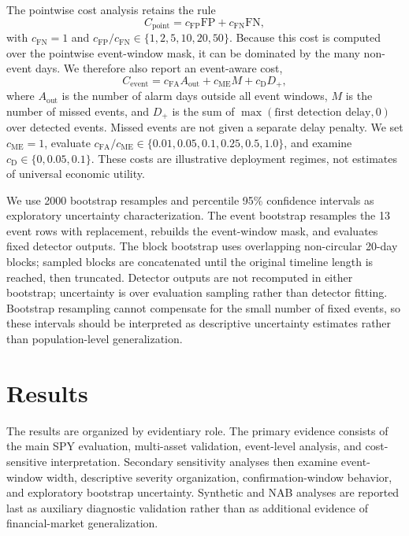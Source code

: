 \documentclass[pdflatex,sn-mathphys-num]{sn-jnl}
\begin{document}
The pointwise cost analysis retains the rule
\begin{equation}
C_{\mathrm{point}}=c_{\mathrm{FP}}\mathrm{FP}+c_{\mathrm{FN}}\mathrm{FN},
\end{equation}
with $c_{\mathrm{FN}}=1$ and $c_{\mathrm{FP}}/c_{\mathrm{FN}}\in\{1,2,5,10,20,50\}$. Because this cost is computed over the pointwise event-window mask, it can be dominated by the many non-event days. We therefore also report an event-aware cost,
\begin{equation}
C_{\mathrm{event}}=c_{\mathrm{FA}}A_{\mathrm{out}}+c_{\mathrm{ME}}M+c_{\mathrm{D}}D_+,
\end{equation}
where $A_{\mathrm{out}}$ is the number of alarm days outside all event windows, $M$ is the number of missed events, and $D_+$ is the sum of $\max(\text{first detection delay},0)$ over detected events. Missed events are not given a separate delay penalty. We set $c_{\mathrm{ME}}=1$, evaluate $c_{\mathrm{FA}}/c_{\mathrm{ME}}\in\{0.01,0.05,0.1,0.25,0.5,1.0\}$, and examine $c_{\mathrm{D}}\in\{0,0.05,0.1\}$. These costs are illustrative deployment regimes, not estimates of universal economic utility.

We use 2000 bootstrap resamples and percentile 95\% confidence intervals as exploratory uncertainty characterization. The event bootstrap resamples the 13 event rows with replacement, rebuilds the event-window mask, and evaluates fixed detector outputs. The block bootstrap uses overlapping non-circular 20-day blocks; sampled blocks are concatenated until the original timeline length is reached, then truncated. Detector outputs are not recomputed in either bootstrap; uncertainty is over evaluation sampling rather than detector fitting. Bootstrap resampling cannot compensate for the small number of fixed events, so these intervals should be interpreted as descriptive uncertainty estimates rather than population-level generalization.

\section{Results}
The results are organized by evidentiary role. The primary evidence consists of the main SPY evaluation, multi-asset validation, event-level analysis, and cost-sensitive interpretation. Secondary sensitivity analyses then examine event-window width, descriptive severity organization, confirmation-window behavior, and exploratory bootstrap uncertainty. Synthetic and NAB analyses are reported last as auxiliary diagnostic validation rather than as additional evidence of financial-market generalization.
\end{document}
